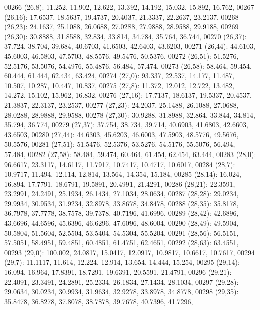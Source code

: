 \begin{DoxyCode}
00266       (26,8): 11.252, 11.902, 12.622, 13.392, 14.192, 15.032, 15.892, 16.762,
00267       (26,16): 17.6537, 18.5637, 19.4737, 20.4037, 21.3337, 22.2637, 23.2137,
00268       (26,23): 24.1637, 25.1088, 26.0688, 27.0288, 27.9888, 28.9588, 29.9188,
00269       (26,30): 30.8888, 31.8588, 32.834, 33.814, 34.784, 35.764, 36.744,
00270       (26,37): 37.724, 38.704, 39.684, 40.6703, 41.6503, 42.6403, 43.6203,
00271       (26,44): 44.6103, 45.6003, 46.5803, 47.5703, 48.5576, 49.5476, 50.5376,
00272       (26,51): 51.5276, 52.5176, 53.5076, 54.4976, 55.4876, 56.484, 57.474,
00273       (26,58): 58.464, 59.454, 60.444, 61.444, 62.434, 63.424,
00274       (27,0): 93.337, 22.537, 14.177, 11.487, 10.507, 10.287, 10.447, 10.837,
00275       (27,8): 11.372, 12.012, 12.722, 13.482, 14.272, 15.102, 15.962, 16.832,
00276       (27,16): 17.7137, 18.6137, 19.5337, 20.4537, 21.3837, 22.3137, 23.2537,
00277       (27,23): 24.2037, 25.1488, 26.1088, 27.0688, 28.0288, 28.9888, 29.9588,
00278       (27,30): 30.9288, 31.8988, 32.864, 33.844, 34.814, 35.794, 36.774,
00279       (27,37): 37.754, 38.734, 39.714, 40.6903, 41.6803, 42.6603, 43.6503,
00280       (27,44): 44.6303, 45.6203, 46.6003, 47.5903, 48.5776, 49.5676, 50.5576,
00281       (27,51): 51.5476, 52.5376, 53.5276, 54.5176, 55.5076, 56.494, 57.484,
00282       (27,58): 58.484, 59.474, 60.464, 61.454, 62.454, 63.444,
00283       (28,0): 96.6617, 23.3117, 14.6117, 11.7917, 10.7417, 10.4717, 10.6017,
00284       (28,7): 10.9717, 11.494, 12.114, 12.814, 13.564, 14.354, 15.184,
00285       (28,14): 16.024, 16.894, 17.7791, 18.6791, 19.5891, 20.4991, 21.4291,
00286       (28,21): 22.3591, 23.2991, 24.2491, 25.1934, 26.1434, 27.1034, 28.0634,
00287       (28,28): 29.0234, 29.9934, 30.9534, 31.9234, 32.8978, 33.8678, 34.8478,
00288       (28,35): 35.8178, 36.7978, 37.7778, 38.7578, 39.7378, 40.7196, 41.6996,
00289       (28,42): 42.6896, 43.6696, 44.6596, 45.6396, 46.6296, 47.6096, 48.6004,
00290       (28,49): 49.5904, 50.5804, 51.5604, 52.5504, 53.5404, 54.5304, 55.5204,
00291       (28,56): 56.5151, 57.5051, 58.4951, 59.4851, 60.4851, 61.4751, 62.4651,
00292       (28,63): 63.4551,
00293       (29,0): 100.002, 24.0817, 15.0417, 12.0917, 10.9817, 10.6617, 10.7617,
00294       (29,7): 11.1117, 11.614, 12.224, 12.914, 13.654, 14.444, 15.254,
00295       (29,14): 16.094, 16.964, 17.8391, 18.7291, 19.6391, 20.5591, 21.4791,
00296       (29,21): 22.4091, 23.3491, 24.2891, 25.2334, 26.1834, 27.1434, 28.1034,
00297       (29,28): 29.0634, 30.0234, 30.9934, 31.9634, 32.9278, 33.8978, 34.8778,
00298       (29,35): 35.8478, 36.8278, 37.8078, 38.7878, 39.7678, 40.7396, 41.7296,

\end{DoxyCode}
